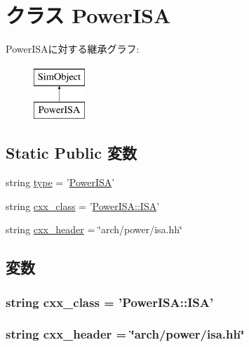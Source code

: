 \hypertarget{classPowerISA_1_1PowerISA}{
\section{クラス PowerISA}
\label{classPowerISA_1_1PowerISA}
}
PowerISAに対する継承グラフ:\begin{figure}[H]
\begin{center}
\leavevmode
\includegraphics[height=2cm]{classPowerISA_1_1PowerISA}
\end{center}
\end{figure}
\subsection*{Static Public 変数}
\begin{DoxyCompactItemize}
\item 
string \hyperlink{classPowerISA_1_1PowerISA_acce15679d830831b0bbe8ebc2a60b2ca}{type} = '\hyperlink{classPowerISA_1_1PowerISA}{PowerISA}'
\item 
string \hyperlink{classPowerISA_1_1PowerISA_a58cd55cd4023648e138237cfc0822ae3}{cxx\_\-class} = '\hyperlink{classPowerISA_1_1ISA}{PowerISA::ISA}'
\item 
string \hyperlink{classPowerISA_1_1PowerISA_a17da7064bc5c518791f0c891eff05fda}{cxx\_\-header} = \char`\"{}arch/power/isa.hh\char`\"{}
\end{DoxyCompactItemize}


\subsection{変数}
\hypertarget{classPowerISA_1_1PowerISA_a58cd55cd4023648e138237cfc0822ae3}{
\subsubsection[{cxx\_\-class}]{\setlength{\rightskip}{0pt plus 5cm}string {\bf cxx\_\-class} = '{\bf PowerISA::ISA}'}}
\label{classPowerISA_1_1PowerISA_a58cd55cd4023648e138237cfc0822ae3}
\hypertarget{classPowerISA_1_1PowerISA_a17da7064bc5c518791f0c891eff05fda}{
\subsubsection[{cxx\_\-header}]{\setlength{\rightskip}{0pt plus 5cm}string {\bf cxx\_\-header} = \char`\"{}arch/power/isa.hh\char`\"{}}}
\label{classPowerISA_1_1PowerISA_a17da7064bc5c518791f0c891eff05fda}


